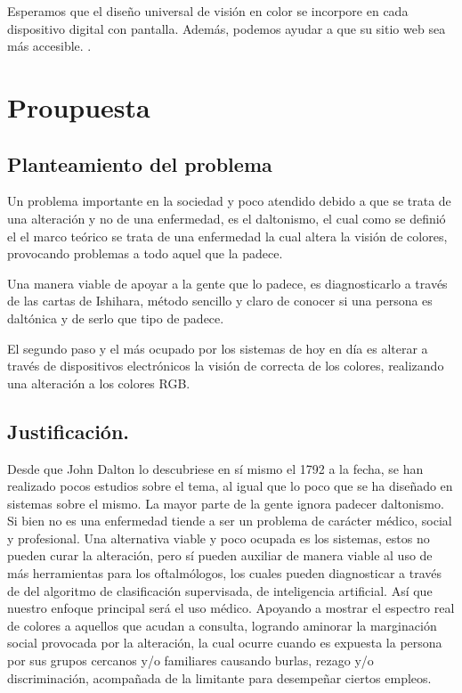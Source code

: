 \documentclass[10pt]{article}
\begin{document}
\setlength{\parskip}{2mm}

Esperamos que el diseño universal de visión en color se incorpore en cada dispositivo digital con pantalla. Además, podemos ayudar a que su sitio web sea más accesible.
\cite{IEEEreferencias:Ref20}.

\section{Proupuesta}

\subsection{Planteamiento del problema}

Un problema importante en la sociedad y poco atendido debido a que se trata de una alteración y no de una enfermedad, es el daltonismo, el cual como se definió el el marco teórico se trata de una enfermedad la cual altera la visión de colores, provocando problemas a todo aquel que la padece.

\setlength{\parskip}{2mm}

Una manera viable de apoyar a la gente que lo padece, es diagnosticarlo a través de las cartas de Ishihara, método sencillo y claro de conocer si una persona es daltónica y de serlo que tipo de padece.

\setlength{\parskip}{2mm}

El segundo paso y el más ocupado por los sistemas de hoy en día es alterar a través de dispositivos electrónicos la visión de correcta de los colores, realizando una alteración a los colores RGB.

\subsection{Justificación.}

Desde que John Dalton lo descubriese en sí mismo el 1792 \cite{IEEEreferencias:Ref2} a la fecha, se han realizado pocos estudios sobre el tema, al igual que lo poco que se ha diseñado en sistemas sobre el mismo. La mayor parte de la gente ignora padecer daltonismo. Si bien no es una enfermedad tiende a ser un problema de carácter médico, social y profesional. Una alternativa viable y poco ocupada es los sistemas, estos no pueden curar la alteración, pero sí pueden auxiliar de manera viable al uso de más herramientas para los oftalmólogos, los cuales pueden diagnosticar a través de del algoritmo de clasificación supervisada, de inteligencia artificial. Así que nuestro enfoque principal será el uso médico. Apoyando a mostrar el espectro real de colores a aquellos que acudan a consulta, logrando aminorar la marginación social provocada por la alteración, la cual ocurre cuando es expuesta la persona por sus grupos cercanos y/o familiares causando burlas, rezago y/o discriminación, acompañada de la limitante para desempeñar ciertos empleos.
\end{document}
